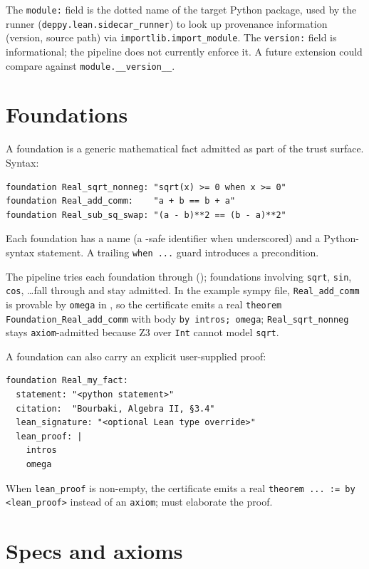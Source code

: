The \texttt{module:} field is the dotted name of the target Python
package, used by the runner (\texttt{deppy.lean.sidecar\_runner}) to
look up provenance information (version, source path) via
\texttt{importlib.import\_module}.  The \texttt{version:} field is
informational; the pipeline does not currently enforce it.  A future
extension could compare against \verb|module.__version__|.

\section{Foundations}
\label{sec:foundations}

A foundation is a generic mathematical fact admitted as part of the
trust surface.  Syntax:

\begin{lstlisting}[language=deppyfile]
foundation Real_sqrt_nonneg: "sqrt(x) >= 0 when x >= 0"
foundation Real_add_comm:    "a + b == b + a"
foundation Real_sub_sq_swap: "(a - b)**2 == (b - a)**2"
\end{lstlisting}

Each foundation has a name (a \Lean{}-safe identifier when
underscored) and a Python-syntax statement.  A trailing
\texttt{when ...} guard introduces a precondition.

The pipeline tries each foundation through \Zthree{}
(); foundations involving \texttt{sqrt}, \texttt{sin},
\texttt{cos}, \dots fall through and stay admitted.  In the example
sympy file, \texttt{Real\_add\_comm} is provable by \texttt{omega}
in \Lean, so the certificate emits a real
\texttt{theorem Foundation\_Real\_add\_comm} with body
\texttt{by intros; omega}; \texttt{Real\_sqrt\_nonneg} stays
\texttt{axiom}-admitted because Z3 over \texttt{Int} cannot model
\texttt{sqrt}.

A foundation can also carry an explicit user-supplied \Lean{} proof:
\begin{lstlisting}[language=deppyfile]
foundation Real_my_fact:
  statement: "<python statement>"
  citation:  "Bourbaki, Algebra II, §3.4"
  lean_signature: "<optional Lean type override>"
  lean_proof: |
    intros
    omega
\end{lstlisting}
When \texttt{lean\_proof} is non-empty, the certificate emits a real
\texttt{theorem ... := by <lean\_proof>} instead of an
\texttt{axiom}; \Lean{} must elaborate the proof.

\section{Specs and axioms}
\label{sec:specs-axioms}

